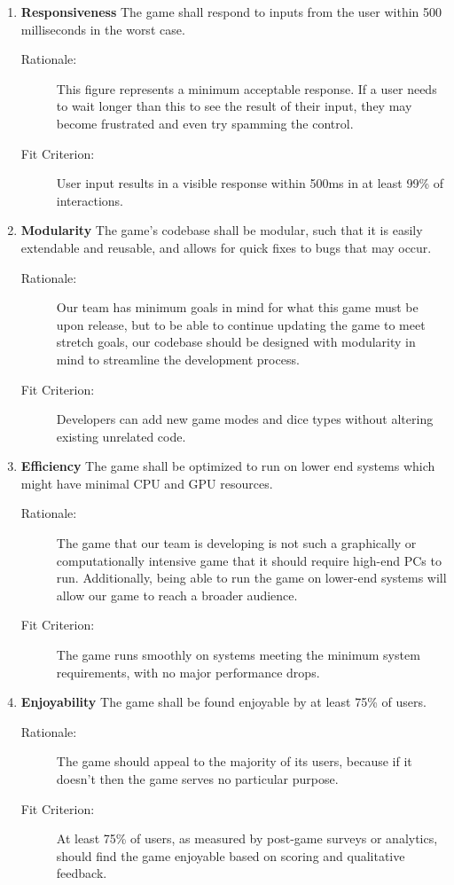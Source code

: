 \begin{enumerate}[label=NFR\arabic*, start=1, left=0pt]
    \item \label{NFR5} \textbf{Responsiveness} The game shall respond to inputs from the user within 500 milliseconds in the worst case.
    \begin{description}
        \item[Rationale:] This figure represents a minimum acceptable response. If a user needs to wait longer than this to see the result of their input, they may become frustrated and even try spamming the control.
        \item[Fit Criterion:] User input results in a visible response within 500ms in at least 99\% of interactions.
    \end{description}

    \item \label{NFR6} \textbf{Modularity} The game’s codebase shall be modular, such that it is easily extendable and reusable, and allows for quick fixes to bugs that may occur.
    \begin{description}
        \item[Rationale:] Our team has minimum goals in mind for what this game must be upon release, but to be able to continue updating the game to meet stretch goals, our codebase should be designed with modularity in mind to streamline the development process.
        \item[Fit Criterion:] Developers can add new game modes and dice types without altering existing unrelated code.
    \end{description}

    \item \label{NFR7} \textbf{Efficiency} The game shall be optimized to run on lower end systems which might have minimal CPU and GPU resources.
    \begin{description}
        \item[Rationale:] The game that our team is developing is not such a graphically or computationally intensive game that it should require high-end PCs to run. Additionally, being able to run the game on lower-end systems will allow our game to reach a broader audience.
        \item[Fit Criterion:] The game runs smoothly on systems meeting the minimum system requirements, with no major performance drops.
    \end{description}

    \item \label{NFR8} \textbf{Enjoyability} The game shall be found enjoyable by at least 75\% of users.
    \begin{description}
        \item[Rationale:] The game should appeal to the majority of its users, because if it doesn't then the game serves no particular purpose.
        \item[Fit Criterion:] At least 75\% of users, as measured by post-game surveys or analytics, should find the game enjoyable based on scoring and qualitative feedback.
    \end{description}


\end{enumerate}

